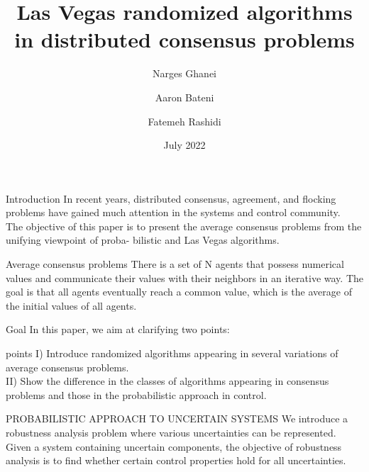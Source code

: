 \documentclass[xcolor={dvipsnames}]{beamer}
\title {Las Vegas randomized algorithms in distributed consensus problems}
\author[Ghanei, Bateni, Rashidi]
{Narges Ghanei \and Aaron Bateni \and Fatemeh Rashidi  }
\institute
{
	Department of Mathematics, Statistics and Computer Science,\\
	University of Tehran
}
\date[July 2022]
{July 2022}
\begin{document}
	
		\maketitle
	\begin{frame}{Introduction}
		In recent years, distributed consensus, agreement, and
		flocking problems have gained much attention in the systems
		and control community.\\
		The objective of this paper is to present the average
		consensus problems from the unifying viewpoint of proba-
		bilistic and Las Vegas algorithms.
		
	\end{frame}

	\begin{frame}{Average consensus problems}
		There is a set of N
		agents that possess numerical values and communicate their
		values with their neighbors in an iterative way. The goal is
		that all agents eventually reach a common value, which is
		the average of the initial values of all agents.
		
	\end{frame}

	\begin{frame}{Goal}
		In this paper, we aim at clarifying two
		points:\\
        \begin{block}{points}
            I) Introduce randomized algorithms appearing 
            in several variations of average consensus problems.\\
            II) Show the difference in
            the classes of algorithms appearing in consensus problems
            and those in the probabilistic approach in control.
        \end{block}
		
		
	\end{frame}

	\begin{frame}{PROBABILISTIC APPROACH TO UNCERTAIN SYSTEMS}
		We introduce a robustness analysis problem where
		various uncertainties can be represented. Given
		a system containing uncertain components, the objective
		of robustness analysis is to find whether certain control
		properties hold for all uncertainties.
		
	\end{frame}
\end{document}
